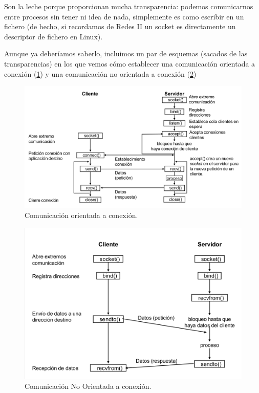 \documentclass{apuntes}[nochap]
\begin{document}
Son la leche porque proporcionan mucha transparencia: podemos comunicarnos entre procesos sin tener ni idea de nada, simplemente es como escribir en un fichero (de hecho, si recordamos de Redes II un socket es directamente un descriptor de fichero en Linux).

Aunque ya deberíamos saberlo, incluimos un par de esquemas (sacados de las transparencias) en los que vemos cómo establecer una comunicación orientada a conexión (\ref{SocketConexion}) y una comunicación no orientada a conexión (\ref{SocketNoConexion})


\begin{figure}[hbtp]
\centering
\includegraphics[width=1\textwidth]{img/SocketConexion.png}
\caption{Comunicación orientada a conexión.}
\label{SocketConexion}
\end{figure}

\begin{figure}[hbtp]
\centering
\includegraphics[width=1\textwidth]{img/SocketNoConexion.png}
\caption{Comunicación No Orientada a conexión.}
\label{SocketNoConexion}
\end{figure}
\newpage
\end{document}
